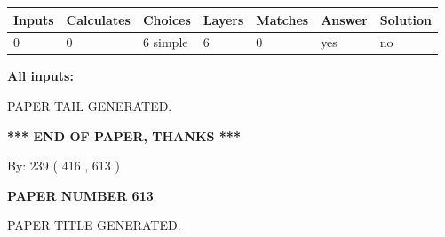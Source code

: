 \documentclass[12pt]{article}
\begin{document}
   
   
   
\noindent\begin{tabular}{|l|l|l|l|l|l|l|}
 \hline
Inputs & Calculates & Choices & Layers & Matches & Answer & Solution \\ \hline
 0  & 
 0  & 
 6
  simple  
  & 
 6  & 
 0  & 
  yes & 
  no 
  \\ \hline
 \end{tabular}
   
   
   
   
\noindent{}
   
   
   
   
\noindent\vspace{0.1in}\hspace{-0.08in} {\textbf{\Large{All inputs: }}}
   
   
   
   
   
   
 \vspace{0.2in}
 
   
   
\vspace{2.0in} PAPER TAIL GENERATED.
   
   
   
   
\vspace{1.0in} 
{\textbf{\large{ *** END OF PAPER, THANKS *** }}} 
   
   
\hspace{1.0in} By: 
 239 ( 416 ,  613 )
   
   
   
   
\newpage 
\setcounter{page}{ 
   613001 } 
   
   
   
   
 {\textbf{ \Large{ PAPER NUMBER  613  }}}
   
   
\vspace{0.2in}
   
   
   
   
   
   
   
   
 \vspace{0.2in}
 
 
 
 
   
   
 PAPER TITLE GENERATED.
   
   
   
\end{document}
